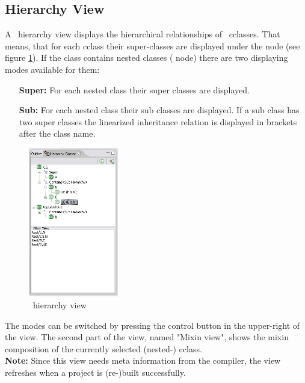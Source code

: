 \subsection{Hierarchy View\label{hierarchyview}}
A \caesarj ~hierarchy view displays the hierarchical relationships of \caesarj ~cclasses. That means, that for each cclass their super-classes are displayed under the  node (see figure \ref{fig:hierarchy_view}). If the class contains nested classes ( node) there are two displaying modes available for them:
\begin{itemize}
	\item[\textbf{Super:}] For each nested class their super classes are displayed.
	\item[\textbf{Sub:}] For each nested class their sub classes are displayed. If a sub class has two super classes the linearized inheritance relation is displayed in brackets after the class name.
\end{itemize}

\begin{figure}[htbp]
	\centering
		\includegraphics[width=0.35\textwidth]{images/hierarchy.png}
	\caption{\caesarj ~hierarchy view}
	\label{fig:hierarchy_view}
\end{figure}

The modes can be switched by pressing the control button in the upper-right of the view. The second part of the view, named "Mixin view", shows the mixin composition of the currently selected (nested-) cclass.\\
\textbf{Note:} Since this view needs meta information from the compiler, the view refreshes when a project is (re-)built successfully.

